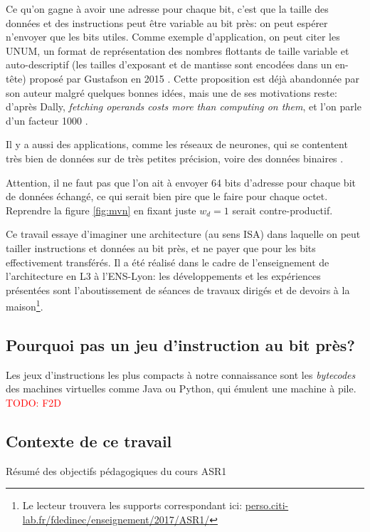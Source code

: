 \documentclass[architecture]{compas2018}
\newcommand{\todo}[1]{\textcolor{red}{TODO: #1}}
\begin{document}
Ce qu'on gagne à avoir une adresse pour chaque bit, c'est que la taille des données et des instructions peut être variable au bit près: on peut espérer n'envoyer que les bits utiles.
Comme exemple d'application, on peut citer les UNUM, un format de représentation des nombres flottants de taille variable et auto-descriptif (les tailles d'exposant et de mantisse sont encodées dans un en-tête) proposé par  Gustafson en 2015 \cite{2015-02-GUSTAFSON}.
Cette proposition est déjà abandonnée par son auteur \cite{2016-09-TICHY} malgré quelques bonnes idées, mais une de ses  motivations reste: 
d'après Dally, \emph{fetching operands costs more than computing on them}, et l'on parle d'un facteur 1000 \cite{Dally:SC2010}.


Il y a aussi des applications, comme les réseaux de neurones, qui se contentent très bien de données sur de très petites précision, voire des données binaires \cite{AndriCRB16,AlemdarEtAl2017:TernaryCNN,AmiriEtAl2018:mixedPrecCNN,Preusser:DATE2018:heteroCNN}. 

Attention, il ne faut pas que l'on ait à envoyer 64 bits d'adresse pour chaque bit de données échangé, ce qui serait bien pire que le faire pour chaque octet. 
Reprendre la figure \ref{fig:mvn} en fixant juste $w_d=1$ serait contre-productif.

Ce travail essaye d'imaginer une architecture (au sens ISA) dans laquelle on peut tailler instructions et données au bit près, et ne payer que pour les bits effectivement transférés.
Il a été réalisé dans le cadre de l'enseignement de l'architecture en L3 à l'ENS-Lyon: les développements et les expériences présentées sont l'aboutissement de séances de travaux dirigés et de devoirs à la maison\footnote{Le lecteur trouvera les supports correspondant ici: \url{perso.citi-lab.fr/fdedinec/enseignement/2017/ASR1/}}. 

\iffalse
\subsection{Pourquoi pas un jeu d'instruction au bit près?}

Les jeux d'instructions les plus compacts à notre connaissance sont les \emph{bytecodes} des machines virtuelles comme Java ou Python, qui émulent une machine à pile.
\todo{F2D}

\subsection{Contexte de ce travail}
Résumé des objectifs pédagogiques du cours ASR1
\end{document}
